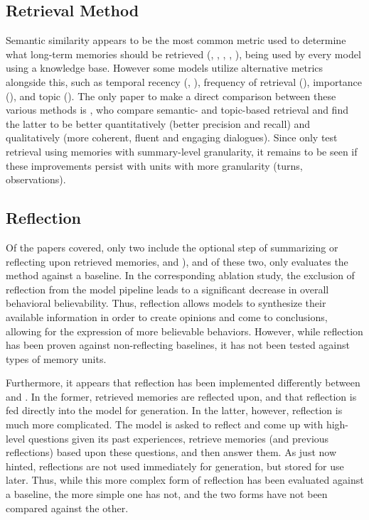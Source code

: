 \subsection{Retrieval Method}

Semantic similarity appears to be the most common metric used to determine what long-term memories should be retrieved (\cite{Hatalis2024}, \cite{Maharana2024}, \cite{Park2023}, \cite{Zhong2023}, \cite{Li2024}), being used by every model using a knowledge base. However some models utilize alternative metrics alongside this, such as temporal recency (\cite{Park2023}, \cite{Li2024}), frequency of retrieval (\cite{Zhong2023}), importance (\cite{Park2023}), and topic (\cite{Li2024}). The only paper to make a direct comparison between these various methods is \cite{Li2024}, who compare semantic- and topic-based retrieval and find the latter to be better quantitatively (better precision and recall) and qualitatively (more coherent, fluent and engaging dialogues). Since \cite{Li2024} only test retrieval using memories with summary-level granularity, it remains to be seen if these improvements persist with units with more granularity (turns, observations).


\subsection{Reflection}

Of the papers covered, only two include the optional step of summarizing or reflecting upon retrieved memories, \cite{Maharana2024} and \cite{Park2023}), and of these two, only \cite{Park2023} evaluates the method against a baseline. In the corresponding ablation study, the exclusion of reflection from the model pipeline leads to a significant decrease in overall behavioral believability. Thus, reflection allows models to synthesize their available information in order to create opinions and come to conclusions, allowing for the expression of more believable behaviors. However, while reflection has been proven against non-reflecting baselines, it has not been tested against types of memory units. 
	
Furthermore, it appears that reflection has been implemented differently between \cite{Maharana2024} and \cite{Park2023}. In the former, retrieved memories are reflected upon, and that reflection is fed directly into the model for generation. In the latter, however, reflection is much more complicated. The model is asked to reflect and come up with high-level questions given its past experiences, retrieve memories (and previous reflections) based upon these questions, and then answer them. As just now hinted, reflections are not used immediately for generation, but stored for use later. Thus, while this more complex form of reflection has been evaluated against a baseline, the more simple one has not, and the two forms have not been compared against the other. 


